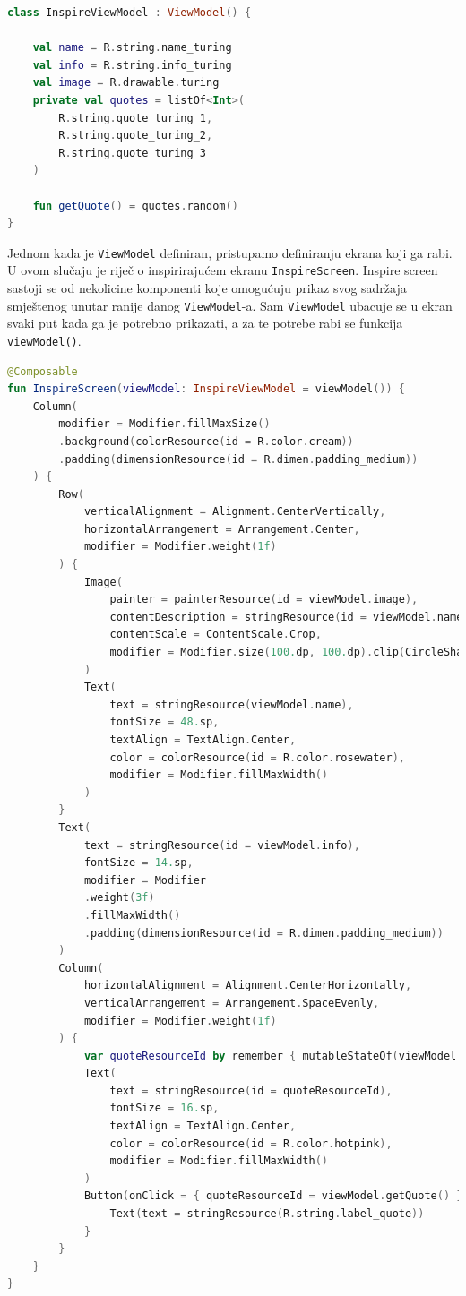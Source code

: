 \documentclass[11pt,a4paper,twoside]{article}
\begin{document}
\begin{lstlisting}[caption={Inspirirajući \texttt{view model}- InspireViewModel.kt}, label={lst:viewmodel-inspire}, language=Kotlin]
class InspireViewModel : ViewModel() {
	
	val name = R.string.name_turing
	val info = R.string.info_turing
	val image = R.drawable.turing
	private val quotes = listOf<Int>(
		R.string.quote_turing_1,
		R.string.quote_turing_2,
		R.string.quote_turing_3
	)
	
	fun getQuote() = quotes.random()
}
\end{lstlisting}

Jednom kada je \texttt{ViewModel} definiran, pristupamo definiranju ekrana koji ga rabi. U ovom slučaju je riječ o inspirirajućem ekranu \texttt{InspireScreen}. Inspire screen sastoji se od nekolicine komponenti koje omogućuju prikaz svog sadržaja smještenog unutar ranije danog \texttt{ViewModel}-a. Sam \texttt{ViewModel} ubacuje se u ekran svaki put kada ga je potrebno prikazati, a za te potrebe rabi se funkcija \texttt{viewModel()}. 

\begin{lstlisting}[caption={Inspirirajući ekran - InspireScreen.kt}, label={lst:screen-inspire-final}, language=Kotlin]
@Composable
fun InspireScreen(viewModel: InspireViewModel = viewModel()) {
	Column(
		modifier = Modifier.fillMaxSize()
		.background(colorResource(id = R.color.cream))
		.padding(dimensionResource(id = R.dimen.padding_medium))
	) {
		Row(
			verticalAlignment = Alignment.CenterVertically,
			horizontalArrangement = Arrangement.Center,
			modifier = Modifier.weight(1f)
		) {
			Image(
				painter = painterResource(id = viewModel.image),
				contentDescription = stringResource(id = viewModel.name),
				contentScale = ContentScale.Crop,
				modifier = Modifier.size(100.dp, 100.dp).clip(CircleShape)
			)
			Text(
				text = stringResource(viewModel.name),
				fontSize = 48.sp,
				textAlign = TextAlign.Center,
				color = colorResource(id = R.color.rosewater),
				modifier = Modifier.fillMaxWidth()
			)
		}
		Text(
			text = stringResource(id = viewModel.info),
			fontSize = 14.sp,
			modifier = Modifier
			.weight(3f)
			.fillMaxWidth()
			.padding(dimensionResource(id = R.dimen.padding_medium))
		)
		Column(
			horizontalAlignment = Alignment.CenterHorizontally,
			verticalArrangement = Arrangement.SpaceEvenly,
			modifier = Modifier.weight(1f)
		) {
			var quoteResourceId by remember { mutableStateOf(viewModel.getQuote()) }
			Text(
				text = stringResource(id = quoteResourceId),
				fontSize = 16.sp,
				textAlign = TextAlign.Center,
				color = colorResource(id = R.color.hotpink),
				modifier = Modifier.fillMaxWidth()
			)
			Button(onClick = { quoteResourceId = viewModel.getQuote() }) {
				Text(text = stringResource(R.string.label_quote))
			}
		}
	}
}
\end{lstlisting}
\end{document}
